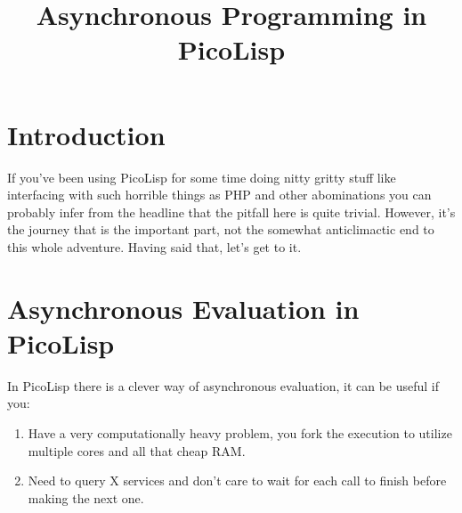 \title{Asynchronous Programming in PicoLisp}

\maketitle





% 


\section{Introduction}
\label{sec:bla}

If you've been using PicoLisp for some time doing nitty gritty stuff
like interfacing with such horrible things as PHP and other
abominations you can probably infer from the headline that the pitfall
here is quite trivial. However, it's the journey that is the important
part, not the somewhat anticlimactic end to this whole adventure.
Having said that, let's get to it.


\section{Asynchronous Evaluation in PicoLisp}
\label{sec:bal}

In PicoLisp there is a clever way of asynchronous evaluation, it can
be useful if you:

\begin{enumerate}
\item Have a very computationally heavy problem, you fork the
  execution to utilize multiple cores and all that cheap RAM.
\item Need to query X services and don't care to wait for each call to
  finish before making the next one.
\end{enumerate}

